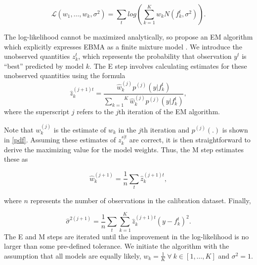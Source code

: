 \documentclass[12pt,fullpage,endnotes]{article}
\begin{document}
\begin{equation}
\mathcal{L}(w_1, \ldots, w_k, \sigma^2)=\sum_tlog\left(\sum_{k=1}^Kw_kN(f^t_k, \sigma^2) \right).
\end{equation}


\noindent The log-likelihood cannot be maximized analytically, so
\citet{Raftery:2005} propose an EM algorithm which explicitly
expresses EBMA as a finite mixture model
\citep{mclachlan:peel:2000,imai:tingley:2012}.  We introduce the
unobserved quantities $z_k^t$, which represents the probability that
observation $y^t$ is ``best'' predicted by model $k$.  The E step
involves calculating estimates for these unobserved quantities using
the formula
\begin{equation}
\label{E-step}
\hat{z}^{(j+1)t}_{k} = \frac{\hat{w}^{(j)}_k
p^{(j)}(y|f_{k}^{t})}{\overset{K}{\underset{k=1}{\sum}}\hat{w}^{(j)}_kp^{(j)}(y|f_{k}^{t})},
\end{equation}
\noindent where the superscript $j$ refers to the $j$th iteration of
the EM algorithm.

Note that $w_k^{(j)}$ is the estimate of $w_k$ in the $j$th iteration and
$p^{(j)}(.)$ is shown in \eqref{pdf}.  Assuming these estimates of
$z_{k}^{s|t}$ are correct, it is then straightforward to derive the
maximizing value for the model weights. Thus, the M step estimates
these as 

\begin{equation}
\label{M-step}
\hat{w}^{(j+1)}_k=\frac{1}{n}\underset{t}{\sum}\hat{z}^{(j+1)t}_{k},
\end{equation}

\noindent where $n$ represents the number of observations in the
calibration dataset.  Finally,

\begin{equation}
\label{sigma}
\hat{\sigma}^{2(j+1)}=\frac{1}{n}\underset{t}{\sum}\overset{K}{\underset{k=1}{\sum}}\hat{z}^{(j+1)t}_{k}(y-f_{k}^{t})^2.
\end{equation}
\noindent The E and M steps are iterated until the improvement in the
log-likelihood is no larger than some pre-defined tolerance.  We
initiate the algorithm with the assumption that all models are equally
likely, $w_k = \frac{1}{K} ~ \forall ~ k \in [1, \ldots, K]$ and
$\sigma^2=1$.
\end{document}
